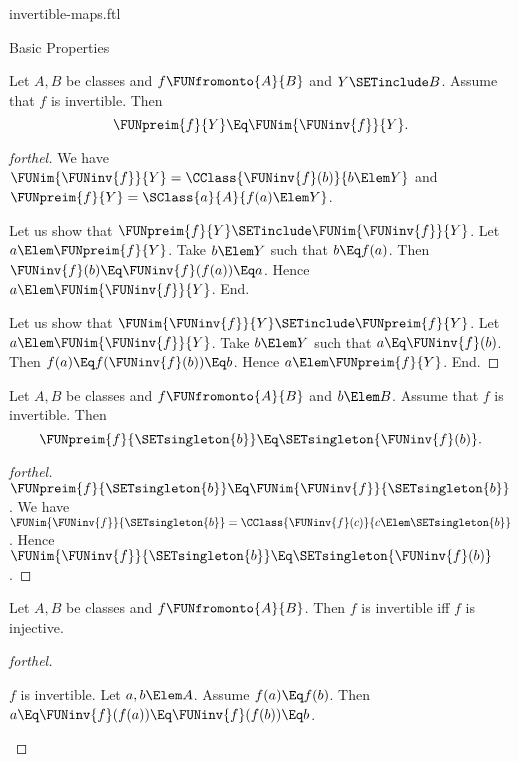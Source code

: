 \documentclass{stex}
\begin{document}
\begin{smodule}{invertible-maps.ftl}
\begin{sfragment}{Basic Properties}
  \begin{proposition}[forthel,id=FOUNDATIONS_09_7726021377785856]
    Let $A, B$ be classes and $f \FUNfromonto{A}{B}$ and $Y \SETinclude B$.
    Assume that $f$ is invertible.
    Then \[ \FUNpreim{f}{Y} \Eq \FUNim{\FUNinv{f}}{Y}. \]
  \end{proposition}
  \begin{proof}[forthel]
    We have $\FUNim{\FUNinv{f}}{Y} = \CClass{\FUNinv{f}(b)}{b \Elem Y}$ and $\FUNpreim{f}{Y} = \SClass{a}{A}{f(a) \Elem Y}$.

    Let us show that $\FUNpreim{f}{Y} \SETinclude \FUNim{\FUNinv{f}}{Y}$.
      Let $a \Elem \FUNpreim{f}{Y}$.
      Take $b \Elem Y$ such that $b \Eq f(a)$.
      Then $\FUNinv{f}(b) \Eq \FUNinv{f}(f(a)) \Eq a$.
      Hence $a \Elem \FUNim{\FUNinv{f}}{Y}$.
    End.

    Let us show that $\FUNim{\FUNinv{f}}{Y} \SETinclude \FUNpreim{f}{Y}$.
      Let $a \Elem \FUNim{\FUNinv{f}}{Y}$.
      Take $b \Elem Y$ such that $a \Eq \FUNinv{f}(b)$.
      Then $f(a) \Eq f(\FUNinv{f}(b)) \Eq b$.
      Hence $a \Elem \FUNpreim{f}{Y}$.
    End.
  \end{proof}

  \begin{corollary}[forthel,id=FOUNDATIONS_09_8607784268464128]
    Let $A, B$ be classes and $f \FUNfromonto{A}{B}$ and $b \Elem B$.
    Assume that $f$ is invertible.
    Then \[ \FUNpreim{f}{\SETsingleton{b}} \Eq \SETsingleton{\FUNinv{f}(b)}. \]
  \end{corollary}
  \begin{proof}[forthel]
    $\FUNpreim{f}{\SETsingleton{b}} \Eq \FUNim{\FUNinv{f}}{\SETsingleton{b}}$.
    We have $\FUNim{\FUNinv{f}}{\SETsingleton{b}} = \CClass{\FUNinv{f}(c)}{c \Elem \SETsingleton{b}}$.
    Hence $\FUNim{\FUNinv{f}}{\SETsingleton{b}} \Eq \SETsingleton{\FUNinv{f}(b)}$.
  \end{proof}

  \begin{proposition}[forthel,id=FOUNDATIONS_09_6777575974109184]
    Let $A, B$ be classes and $f \FUNfromonto{A}{B}$.
    Then $f$ is invertible iff $f$ is injective.
  \end{proposition}
  \begin{proof}[forthel]
    \begin{case}{$f$ is invertible.}
      Let $a, b \Elem A$.
      Assume $f(a) \Eq f(b)$.
      Then $a \Eq \FUNinv{f}(f(a)) \Eq \FUNinv{f}(f(b)) \Eq b$.
    \end{case}


\end{proof}
\end{sfragment}
\end{smodule}
\end{document}
